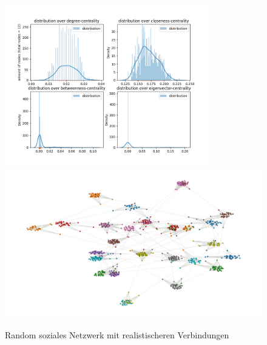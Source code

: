 \FloatBarrier
\begin{figure}[h!]%
  \centering
  \includegraphics[width=0.8\textwidth]{Graphics/generatedPlotDensity.png}
  \includegraphics[width=1.0\textwidth]{Graphics/generatedPlot.png}
  \caption{Random soziales Netzwerk mit realistischeren Verbindungen}
  \label{fig:distributionALL}
\end{figure}
\FloatBarrier
